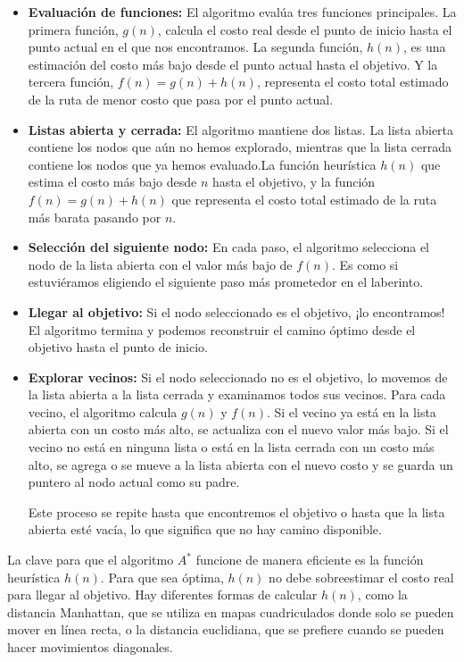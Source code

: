 \begin{itemize}
\item \textbf{Evaluación de funciones:} El algoritmo evalúa tres funciones principales. 
La primera función, \(g(n)\), calcula el costo real desde el punto de inicio hasta el punto actual 
en el que nos encontramos. La segunda función, \(h(n)\), es una estimación del costo más bajo desde el punto actual 
hasta el objetivo. Y la tercera función, \(f(n) = g(n) + h(n)\), representa el costo total estimado de la ruta de menor 
costo que pasa por el punto actual.

\item \textbf{Listas abierta y cerrada:} El algoritmo mantiene dos listas. La lista abierta contiene los nodos que aún no 
hemos explorado, mientras que la lista cerrada contiene los nodos que ya hemos evaluado.La función heurística \(h(n)\) que
estima el costo más bajo desde \(n\) hasta el objetivo, y la función \(f(n) = g(n) + h(n)\) que representa el costo total
estimado de la ruta más barata pasando por \(n\).

\item \textbf{ Selección del siguiente nodo:} En cada paso, el algoritmo selecciona el nodo de la lista abierta con el 
valor más bajo de \(f(n)\). Es como si estuviéramos eligiendo el siguiente paso más prometedor en el laberinto.

\item \textbf{Llegar al objetivo:} Si el nodo seleccionado es el objetivo, ¡lo encontramos! El algoritmo termina y 
podemos reconstruir el camino óptimo desde el objetivo hasta el punto de inicio.

\item \textbf{Explorar vecinos:} Si el nodo seleccionado no es el objetivo, lo movemos de la lista abierta a la lista 
cerrada y examinamos todos sus vecinos. Para cada vecino, el algoritmo calcula \(g(n)\) y \(f(n)\). Si el vecino ya está 
en la lista abierta con un costo más alto, se actualiza con el nuevo valor más bajo. Si el vecino no está en ninguna lista 
o está en la lista cerrada con un costo más alto, se agrega o se mueve a la lista abierta con el nuevo costo y se guarda 
un puntero al nodo actual como su padre.

Este proceso se repite hasta que encontremos el objetivo o hasta que la lista abierta esté vacía, lo que significa que no 
hay camino disponible.

\end{itemize}


La clave para que el algoritmo \(A^*\) funcione de manera eficiente es la función heurística \(h(n)\). Para que sea 
óptima, \(h(n)\) no debe sobreestimar el costo real para llegar al objetivo. Hay diferentes formas de calcular \(h(n)\), 
como la distancia Manhattan, que se utiliza en mapas cuadriculados donde solo se pueden mover en línea recta, 
o la distancia euclidiana, que se prefiere cuando se pueden hacer movimientos diagonales.

